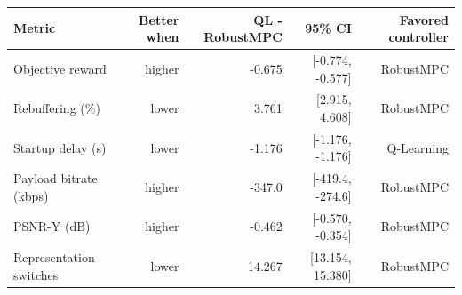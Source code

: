 \begin{tabular}{lrrrr}
\toprule
Metric & Better when & QL - RobustMPC & 95\% CI & Favored controller \\
\midrule
Objective reward & higher & -0.675 & [-0.774, -0.577] & RobustMPC \\
Rebuffering (\%) & lower & 3.761 & [2.915, 4.608] & RobustMPC \\
Startup delay (s) & lower & -1.176 & [-1.176, -1.176] & Q-Learning \\
Payload bitrate (kbps) & higher & -347.0 & [-419.4, -274.6] & RobustMPC \\
PSNR-Y (dB) & higher & -0.462 & [-0.570, -0.354] & RobustMPC \\
Representation switches & lower & 14.267 & [13.154, 15.380] & RobustMPC \\
\bottomrule
\end{tabular}
